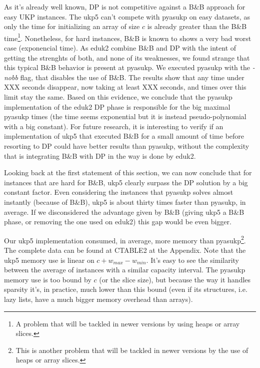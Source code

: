 \documentclass[runningheads,a4paper]{llncs}
\begin{document}

As it's already well known, DP is not competitive against a B\&B approach for easy UKP instances. The ukp5 can't compete with pyasukp on easy datasets, as only the time for initializing an array of size \(c\) is already greater than the B\&B time\footnote{A problem that will be tackled in newer versions by using heaps or array slices.}. Nonetheless, for hard instances, B\&B is known to shows a very bad worst case (exponencial time). As eduk2 combine B\&B and DP with the intent of getting the strenghts of both, and none of its weaknesses, we found strange that this typical B\&B behavior is present at pyasukp. We executed pyasukp with the \emph{-nobb} flag, that disables the use of B\&B. The results show that any time under XXX seconds disappear, now taking at least XXX seconds, and times over this limit stay the same. Based on this evidence, we conclude that the pyasukp implementation of the eduk2 DP phase is responsible for the big maximal pyasukp times (the time seems exponential but it is instead pseudo-polynomial with a big constant). For future research, it is interesting to verify if an implementation of ukp5 that executed B\&B for a small amount of time before resorting to DP could have better results than pyasukp, without the complexity that is integrating B\&B with DP in the way is done by eduk2.

Looking back at the first statement of this section, we can now conclude that for instances that are hard for B\&B, ukp5 clearly surpass the DP solution by a big constant factor. Even considering the instances that pyasukp solves almost instantly (because of B\&B), ukp5 is about thirty times faster than pyasukp, in average. If we disconsidered the advantage given by B\&B (giving ukp5 a B\&B phase, or removing the one used on eduk2) this gap would be even bigger.

Our ukp5 implementation consumed, in average, more memory than pyasukp\footnote{This is another problem that will be tackled in newer versions by the use of heaps or array slices.}. The complete data can be found at CTABLE2 at the Appendix. Note that the ukp5 memory use is linear on \(c + w_{max} - w_{min}\). It's easy to see the similarity between the average of instances with a similar capacity interval. The pyasukp memory use is too bound by \(c\) (or the slice size), but because the way it handles sparsity it's, in practice, much lower than this bound (even if its structures, i.e. lazy lists, have a much bigger memory overhead than arrays).
\end{document}
